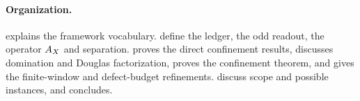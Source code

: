 \paragraph{Organization.}
 explains the framework vocabulary.
 define the
ledger, the odd readout, the operator \(A_{X}\) and separation.
 proves the direct confinement results,
 discusses domination and Douglas factorization,
 proves the confinement theorem, and
 gives the finite-window and
defect-budget refinements.   discuss
scope and possible instances, and  concludes.
